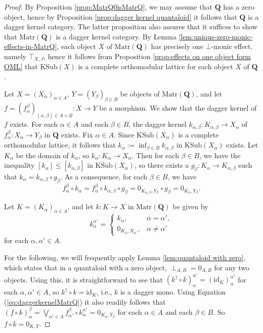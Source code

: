 \documentclass[12pt]{tac}
\theoremstyle{definition}
\theoremstyle{remark}
\newcommand{\<}{\langle}
\renewcommand{\>}{\rangle}
\renewcommand{\:}{\colon}
\newcommand{\id}{\mathrm{id}}
\begin{document}
\begin{proof}
By Proposition \ref{prop:MatrQ0isMatrQ}, we may assume that $\mathbf Q$ has a zero object, hence by Proposition \ref{prop:dagger kernel quantaloid} it follows that $\mathbf Q$ is a dagger kernel category. The latter proposition also assures that it suffices to show that $\mathrm{Matr}(\mathbf Q)$ is a dagger kernel category. By Lemma \ref{lem:unique-zero-monic-effects-in-MatrQ}, each object $X$ of $\mathrm{Matr}(\mathbf Q)$ has precisely one $\bot$-monic effect, namely $\top_{X,J}$, hence it follows from Proposition \ref{prop:effects on one object form OML} that $\mathrm{KSub}(X)$ is a complete orthomodular lattice for each object $X$ of $\mathbf Q$.

Let $X=(X_\alpha)_{\alpha\in A}$, $Y=(Y_\beta)_{\beta\in B}$ be objects of $\mathrm{Matr}(\mathbf Q)$, and let $f=(f_\alpha^\beta)_{(\alpha,\beta)\in A\times B}:X\to Y$ be a morphism. We show that the dagger kernel of $f$ exists.
For each $\alpha\in A$ and each $\beta\in B$, the dagger kernel $k_{\alpha,\beta} :K_{\alpha,\beta}\to X_\alpha$ of $f_{\alpha}^\beta:X_\alpha\to Y_\beta$ in $\mathbf Q$ exists. Fix $\alpha\in A$. Since $\mathrm{KSub}(X_\alpha)$ is a complete orthomodular lattice, it follows that $k_\alpha:=\inf_{\beta\in B}k_{\alpha,\beta}$ in $\mathrm{KSub}(X_\alpha)$ exists. Let $K_\alpha$ be the domain of $k_\alpha$, so $k_\alpha:K_\alpha\to X_\alpha$. Then for each $\beta\in B$, we have the inequality $[k_\alpha]\leq [k_{\alpha,\beta}]$ in $\mathrm{KSub}(X_\alpha)$, so there exists a $g_\beta: K_\alpha\to K_{\alpha,\beta}$ such that $k_\alpha=k_{\alpha,\beta}\circ g_\beta$. As a consequence, for each $\beta\in B$, we have 
\begin{equation}\label{eq:daggerkernelMatrQ}f_{\alpha}^\beta\circ k_\alpha=f_\alpha^\beta\circ k_{\alpha,\beta}\circ g_\beta=0_{K_{\alpha,\beta},Y_\beta}\circ g_\beta=0_{K_\alpha,Y_\beta}.
\end{equation}

Let $K=(K_\alpha)_{\alpha\in A}$, and let $k:K\to X$ in $\mathrm{Matr}(\mathbf Q)$ be given by 
\[ k_{\alpha}^{\alpha'} = \begin{cases} k_\alpha, & \alpha=\alpha',\\
 0_{K_\alpha,X_{\alpha'}}, & \alpha\neq\alpha'
 \end{cases}\]
 for each $\alpha,\alpha'\in A$.

For the following, we will frequently apply  Lemma \ref{lem:quantaloid with zero}, which states that in a quantaloid with a zero object, $\perp_{A,B}=0_{A,B}$ for any two objects. Using this, it is straightforward to see that $(k^\dag\circ k)_\alpha^{\alpha'}=(\id_{K})_\alpha^{\alpha'}$ for each $\alpha,\alpha'\in A$, so $k^\dag\circ k=\id_{K}$, i.e., $k$ is a dagger mono.
Using Equation (\ref{eq:daggerkernelMatrQ}) it also readily follows that $(f\circ k)_\alpha^\beta=\bigvee_{\alpha'\in A}f_{\alpha'}^\beta\circ k_\alpha^{\alpha'}=0_{K_\alpha,Y_\beta}$ for each $\alpha\in A$ and each $\beta\in B$. So $f\circ k=0_{K,Y}$.


\end{proof}
\end{document}
